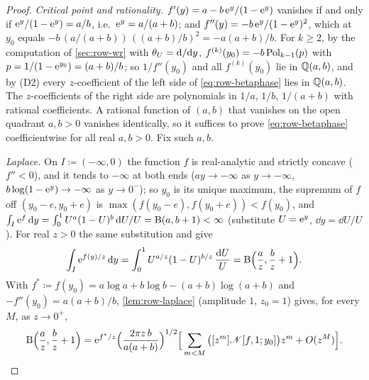 \begin{proof}
\emph{Critical point and rationality.} $f'(y)=a-b\,\mathrm{e}^y/(1-\mathrm{e}^y)$ vanishes if and only if $\mathrm{e}^y/(1-\mathrm{e}^y)=a/b$, i.e.\ $\mathrm{e}^y=a/(a+b)$; and $f''(y)=-b\,\mathrm{e}^y/(1-\mathrm{e}^y)^2$, which at $y_0$ equals $-b\,(a/(a+b))\,((a+b)/b)^2=-a(a+b)/b$. For $k\geq2$, by the computation of \cref{sec:row-wr} with $\theta_{U}=\mathrm{d}/\mathrm{d} y$, $f^{(k)}(y_0)=-b\,\mathrm{Pol}_{k-1}(p)$ with $p=1/(1-\mathrm{e}^{y_0})=(a+b)/b$; so $1/f''(y_0)$ and all $f^{(k)}(y_0)$ lie in $\mathbb{Q}(a,b)$, and by (D2) every $z$-coefficient of the left side of \eqref{eq:row-betaphase} lies in $\mathbb{Q}(a,b)$. The $z$-coefficients of the right side are polynomials in $1/a$, $1/b$, $1/(a+b)$ with rational coefficients. A rational function of $(a,b)$ that vanishes on the open quadrant $a,b>0$ vanishes identically, so it suffices to prove \eqref{eq:row-betaphase} coefficientwise for all real $a,b>0$. Fix such $a,b$.

\emph{Laplace.} On $I\coloneqq(-\infty,0)$ the function $f$ is real-analytic and strictly concave ($f''<0$), and it tends to $-\infty$ at both ends ($ay\to-\infty$ as $y\to-\infty$, $b\log(1-\mathrm{e}^y)\to-\infty$ as $y\to0^-$); so $y_0$ is its unique maximum, the supremum of $f$ off $(y_0-e,y_0+e)$ is $\max(f(y_0-e),f(y_0+e))<f(y_0)$, and $\int_I\mathrm{e}^{f}\,\mathrm{d} y=\int_0^1U^{a}(1-U)^{b}\,\mathrm{d} U/U=\mathrm{B}(a,b+1)<\infty$ (substitute $U=\mathrm{e}^y$, $\dd y=\dd U/U$). For real $z>0$ the same substitution and \cite[5.12.1]{DLMF} give
\[
\int_I\mathrm{e}^{f(y)/z}\,\mathrm{d} y=\int_0^1U^{a/z}(1-U)^{b/z}\,\frac{\mathrm{d} U}{U}=\mathrm{B}\Big(\frac az,\frac bz+1\Big).
\]
With $f^\ast\coloneqq f(y_0)=a\log a+b\log b-(a+b)\log(a+b)$ and $-f''(y_0)=a(a+b)/b$, \cref{lem:row-laplace} (amplitude $1$, $z_0=1$) gives, for every $M$, as $z\to0^+$,
\begin{equation}
\label{eq:row-betalap}
\mathrm{B}\Big(\frac az,\frac bz+1\Big)=\mathrm{e}^{f^\ast/z}\Big(\frac{2\pi z\,b}{a(a+b)}\Big)^{1/2}\Big[\sum_{m<M}\big([z^m]\mathscr{N}[f,1;y_0]\big)z^m+O(z^M)\Big].
\end{equation}


\end{proof}
